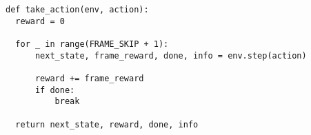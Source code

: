 \begin{lstlisting}[style=codestyle, basicstyle=\ttfamily\footnotesize, caption={Car Racing frame skipping}, label=lst:frame_skipping]
def take_action(env, action):
  reward = 0

  for _ in range(FRAME_SKIP + 1):
      next_state, frame_reward, done, info = env.step(action)

      reward += frame_reward
      if done:
          break

  return next_state, reward, done, info
\end{lstlisting}
